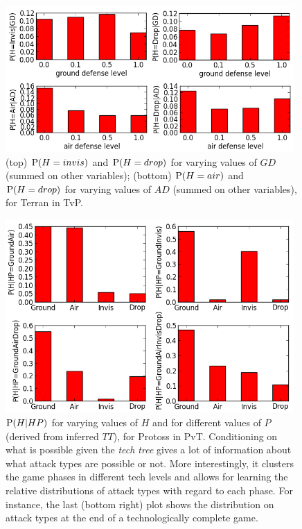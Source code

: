 \begin{figure}[!h]
\centerline{\includegraphics[width=11cm]{images/Terran_Prob_H_crop.png}}
\caption{(top) $\mathrm{P}(H=invis)$ and $\mathrm{P}(H=drop)$ for varying values of $GD$ (summed on other variables); (bottom) $\mathrm{P}(H=air)$ and $\mathrm{P}(H=drop)$ for varying values of $AD$ (summed on other variables), for Terran in TvP. %
}
\label{fig:P_H_AD}
\end{figure}

\begin{figure}[!h]
\centerline{\includegraphics[width=11cm]{images/PossibleP.png}}
\caption{$\mathrm{P}(H|HP)$ for varying values of $H$ and for different values of $P$ (derived from inferred $TT$), for Protoss in PvT. Conditioning on what is possible given the \textit{tech tree} gives a lot of information about what attack types are possible or not. More interestingly, it clusters the game phases in different tech levels and allows for learning the relative distributions of attack types with regard to each phase. For instance, the last (bottom right) plot shows the distribution on attack types at the end of a technologically complete game.}
\label{fig:PossibleP}
\end{figure}


